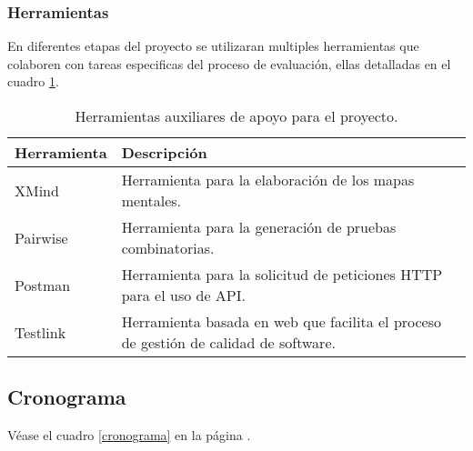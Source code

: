 \subsubsection{Herramientas}
En diferentes etapas del proyecto se utilizaran multiples herramientas que
colaboren con tareas especificas del proceso de evaluación, ellas detalladas en
el cuadro \ref{herramientas}.

\begin{table}
\centering
\begin{tabular}{|l|l|}
\hline
\textbf{Herramienta} & \textbf{Descripción} \\
\hline
XMind & Herramienta para la elaboración de los mapas mentales. \\
Pairwise & Herramienta para la generación de pruebas combinatorias. \\
Postman & Herramienta para la solicitud de peticiones HTTP para el uso de API.\\
Testlink & Herramienta basada en web que facilita el proceso de gestión de calidad de software. \\
\hline
\end{tabular}
\caption{Herramientas auxiliares de apoyo para el proyecto.}
\label{herramientas}
\end{table}

\subsection{Cronograma}
Véase el cuadro \ref{cronograma} en la página \pageref{cronograma}.


